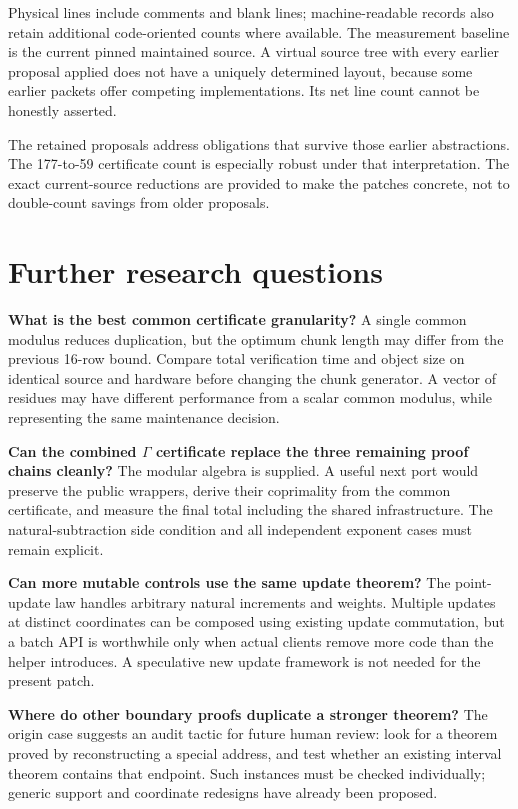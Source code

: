 \documentclass[11pt,letterpaper]{article}
\begin{document}
Physical lines include comments and blank lines; machine-readable records also retain additional code-oriented counts where available. The measurement baseline is the current pinned maintained source. A virtual source tree with every earlier proposal applied does not have a uniquely determined layout, because some earlier packets offer competing implementations. Its net line count cannot be honestly asserted.

The retained proposals address obligations that survive those earlier abstractions. The 177-to-59 certificate count is especially robust under that interpretation. The exact current-source reductions are provided to make the patches concrete, not to double-count savings from older proposals.

\section{Further research questions}

\textbf{What is the best common certificate granularity?} A single common modulus reduces duplication, but the optimum chunk length may differ from the previous 16-row bound. Compare total verification time and object size on identical source and hardware before changing the chunk generator. A vector of residues may have different performance from a scalar common modulus, while representing the same maintenance decision.

\textbf{Can the combined \(\Gamma\) certificate replace the three remaining proof chains cleanly?} The modular algebra is supplied. A useful next port would preserve the public wrappers, derive their coprimality from the common certificate, and measure the final total including the shared infrastructure. The natural-subtraction side condition and all independent exponent cases must remain explicit.

\textbf{Can more mutable controls use the same update theorem?} The point-update law handles arbitrary natural increments and weights. Multiple updates at distinct coordinates can be composed using existing update commutation, but a batch API is worthwhile only when actual clients remove more code than the helper introduces. A speculative new update framework is not needed for the present patch.

\textbf{Where do other boundary proofs duplicate a stronger theorem?} The origin case suggests an audit tactic for future human review: look for a theorem proved by reconstructing a special address, and test whether an existing interval theorem contains that endpoint. Such instances must be checked individually; generic support and coordinate redesigns have already been proposed.
\end{document}
